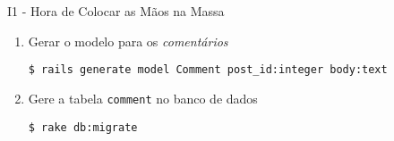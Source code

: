 \begin{frame}{I1 - Hora de Colocar as Mãos na Massa}
	\begin{enumerate}
		\item Gerar o modelo para os \textit{comentários} 
     \begin{lstlisting}[style=BashInputBasicStyle]
				$ rails generate model Comment post_id:integer body:text
     \end{lstlisting}
    \item Gere a tabela \verb|comment| no banco de dados
    \begin{lstlisting}[style=BashInputBasicStyle]
	    $ rake db:migrate
    \end{lstlisting}
	\end{enumerate}  
\end{frame}